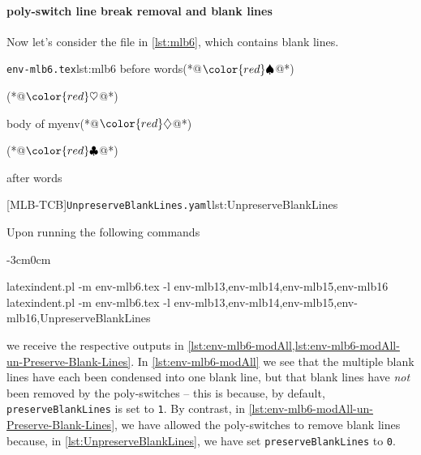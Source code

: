 \documentclass[10pt]{article}
\newenvironment{widepage}{\begin{adjustwidth}{-3cm}{0cm}}{\end{adjustwidth}}
\newcommand{\BeginStartsOnOwnLine}{\color{red}\spadesuit}
\newcommand{\BodyStartsOnOwnLine}{\color{red}\heartsuit}
\newcommand{\EndStartsOnOwnLine}{\color{red}\diamondsuit}
\newcommand{\EndFinishesWithLineBreak}{\color{red}\clubsuit}
\begin{document}
 \paragraph{poly-switch line break removal and blank lines}
  \begin{example}
  Now let's consider the file in \cref{lst:mlb6}, which contains blank lines.

  \begin{cmhtcbraster}
   \begin{cmhlistings}[style=tcblatex,escapeinside={(*@}{@*)}]{\texttt{env-mlb6.tex}}{lst:mlb6}
before words(*@$\BeginStartsOnOwnLine$@*)


\begin{myenv}(*@$\BodyStartsOnOwnLine$@*)


body of myenv(*@$\EndStartsOnOwnLine$@*)


\end{myenv}(*@$\EndFinishesWithLineBreak$@*)

after words
\end{cmhlistings}
   [MLB-TCB]{\texttt{UnpreserveBlankLines.yaml}}{lst:UnpreserveBlankLines}
  \end{cmhtcbraster}

  Upon running the following commands 
  \begin{widepage}

   \begin{commandshell}
latexindent.pl -m env-mlb6.tex -l env-mlb13,env-mlb14,env-mlb15,env-mlb16
latexindent.pl -m env-mlb6.tex -l env-mlb13,env-mlb14,env-mlb15,env-mlb16,UnpreserveBlankLines
\end{commandshell}

  \end{widepage}
  we receive the respective outputs in
  \cref{lst:env-mlb6-modAll,lst:env-mlb6-modAll-un-Preserve-Blank-Lines}. In
  \cref{lst:env-mlb6-modAll} we see that the multiple blank lines have each been
  condensed into one blank line, but that blank lines have \emph{not} been removed by the
  poly-switches -- this is because, by default, \texttt{preserveBlankLines} is set to
  \texttt{1}. By contrast, in \cref{lst:env-mlb6-modAll-un-Preserve-Blank-Lines}, we have
  allowed the poly-switches to remove blank lines because, in
  \cref{lst:UnpreserveBlankLines}, we have set \texttt{preserveBlankLines} to \texttt{0}.


\end{example}
\end{document}
